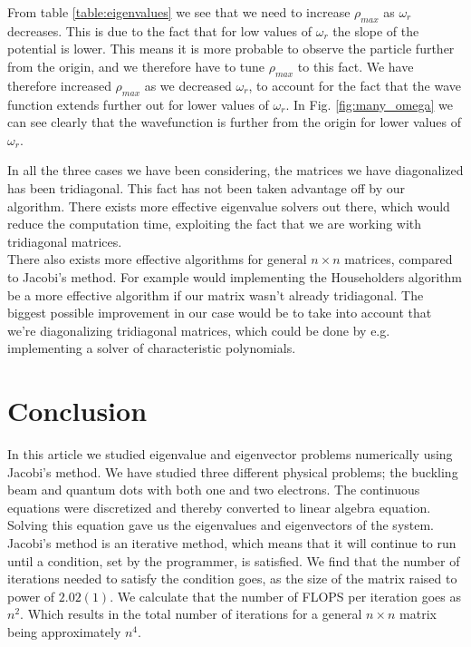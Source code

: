 \documentclass[%
 reprint,
nofootinbib,
aps,
]{revtex4-1}
\begin{document}
From table \vref{table:eigenvalues} we see that we need to increase $\rho_{max}$ as $\omega_r$ decreases. This is due to the fact that for low values of $\omega_r$ the slope of the potential is lower. This means it is more probable to observe the particle further from the origin, and we therefore have to tune $\rho_{max}$ to this fact. We have therefore increased $\rho_{max}$ as we decreased $\omega_r$, to account for the fact that the wave function extends further out for lower values of $\omega_r$. In Fig. \ref{fig:many_omega} we can see clearly that the wavefunction is further from the origin for lower values of $\omega_r$.


In all the three cases we have been considering, the matrices we have diagonalized has been tridiagonal. This fact has not been taken advantage off by our algorithm. There exists more effective eigenvalue solvers out there, which would reduce the computation time, exploiting the fact that we are working with tridiagonal matrices.\\
There also exists more effective algorithms for general $n\times n$ matrices, compared to Jacobi's method. For example would implementing the Householders algorithm be a more effective algorithm if our matrix wasn't already tridiagonal. The biggest possible improvement in our case would be to take into account that we're diagonalizing tridiagonal matrices, which could be done by e.g. implementing a solver of characteristic polynomials.

\section{Conclusion}
In this article we studied eigenvalue and eigenvector problems numerically using Jacobi's method. We have studied three different physical problems; the buckling beam and quantum dots with both one and two electrons. The continuous equations were discretized and thereby converted to linear algebra equation. Solving this equation gave us the eigenvalues and eigenvectors of the system. \\
Jacobi's method is an iterative method,  which means that it will continue to run until a condition, set by the programmer, is satisfied. We find that the number of iterations needed to satisfy the condition goes, as the size of the matrix raised to power of $2.02(1)$. We calculate that the number of FLOPS per iteration goes as $n^2$. Which results in the total number of iterations for a general $n\times n$ matrix being approximately $n^4$.
\end{document}
